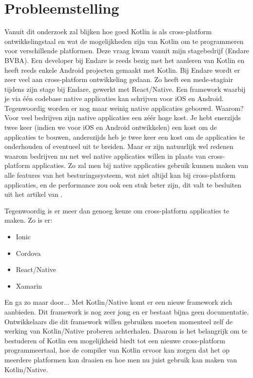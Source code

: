 \section{Probleemstelling}
\label{sec:probleemstelling}
Vanuit dit onderzoek zal blijken hoe goed Kotlin is als cross-platform ontwikkelingstaal en wat de mogelijkheden zijn van Kotlin om te programmeren voor verschillende platformen. Deze vraag kwam vanuit mijn stagebedrijf (Endare BVBA). Een developer bij Endare is reeds bezig met het aanleren van Kotlin en heeft reeds enkele Android projecten gemaakt met Kotlin. Bij Endare wordt er zeer veel aan cross-platform ontwikkeling gedaan. Zo heeft een mede-stagiair tijdens zijn stage bij Endare, gewerkt met React/Native. Een framework waarbij je via één codebase native applicaties kan schrijven voor iOS en Android. Tegenwoordig worden er nog maar weinig native applicaties gebouwd. Waarom? Voor veel bedrijven zijn native applicaties een zéér hoge kost. Je hebt enerzijds twee keer (indien we voor iOS en Android ontwikkelen) een kost om de applicaties te bouwen, anderszijds heb je twee keer een kost om de applicaties te onderhouden of eventueel uit te breiden. Maar er zijn natuurlijk wel redenen waarom bedrijven nu net wel native applicaties willen in plaats van cross-platform applicaties. Zo zal men bij native applicaties gebruik kunnen maken van alle features van het besturingssysteem, wat niet altijd kan bij cross-platform applicaties, en de performance zou ook een stuk beter zijn, dit valt te besluiten uit het artikel van \textcite{NativeVsCross}. 

Tegenwoordig is er meer dan genoeg keuze om cross-platform applicaties te maken. Zo is er:
\begin{itemize}
	\item Ionic
	\item Cordova
	\item React/Native
	\item Xamarin
\end{itemize}
En ga zo maar door... Met Kotlin/Native komt er een nieuw framework zich aanbieden. Dit framework is nog zeer jong en er bestaat bijna geen documentatie. Ontwikkelaars die dit framework willen gebruiken moeten momenteel zelf de werking van Kotlin/Native proberen achterhalen. Daarom is het belangrijk om te bestuderen of Kotlin een mogelijkheid biedt tot een nieuwe cross-platform programmeertaal, hoe de compiler van Kotlin ervoor kan zorgen dat het op meerdere platformen kan draaien en hoe men nu juist gebruik kan maken van Kotlin/Native. 

